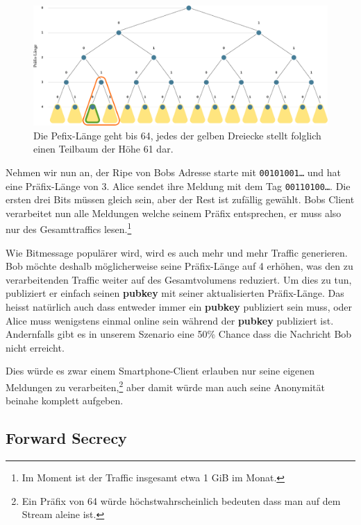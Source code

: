 \documentclass{bfh}
\newcommand{\obj}[1]{\textbf{\textcolor{OliveGreen}{#1}}}
\begin{document}
  \begin{figure}[htp]
  \centering
  \includegraphics[width=\textwidth]{images/prefix-filter-binary-tree.pdf}
  \caption[Präfix-Filter: Binärbaum]{Die Pefix-Länge geht bis 64, jedes der gelben Dreiecke stellt folglich einen Teilbaum der Höhe 61 dar.}
  \label{fig:bintree}
  \end{figure}

  Nehmen wir nun an, der Ripe von Bobs Adresse starte mit \texttt{00101001\ldots} und hat eine Präfix-Länge von 3. Alice sendet ihre Meldung mit dem Tag \texttt{00110100\ldots}. Die ersten drei Bits müssen gleich sein, aber der Rest ist zufällig gewählt. Bobs Client verarbeitet nun alle Meldungen welche seinem Präfix entsprechen, er muss also nur  des Gesamttraffics lesen.\footnote{Im Moment ist der Traffic insgesamt etwa 1 GiB im Monat.}

  Wie Bitmessage populärer wird, wird es auch mehr und mehr Traffic generieren. Bob möchte deshalb möglicherweise seine Präfix-Länge auf 4 erhöhen, was den zu verarbeitenden Traffic weiter auf  des Gesamtvolumens reduziert. Um dies zu tun, publiziert er einfach seinen \obj{pubkey} mit seiner aktualisierten Präfix-Länge. Das heisst natürlich auch dass entweder immer ein \obj{pubkey} publiziert sein muss, oder Alice muss wenigstens einmal online sein während der \obj{pubkey} publiziert ist. Andernfalls gibt es in unserem Szenario eine 50\% Chance dass die Nachricht Bob nicht erreicht.

  Dies würde es zwar einem Smartphone-Client erlauben nur seine eigenen Meldungen zu verarbeiten,\footnote{Ein Präfix von 64 würde höchstwahrscheinlich bedeuten dass man auf dem Stream aleine ist.} aber damit würde man auch seine Anonymität beinahe komplett aufgeben.

  \subsection{Forward Secrecy}
\end{document}
